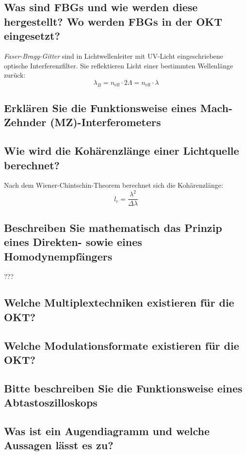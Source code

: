 \documentclass[a4paper]{scrartcl}
\begin{document}
\subsection*{Was sind FBGs und wie werden diese hergestellt? Wo werden FBGs in der OKT eingesetzt?}
\emph{Faser-Bragg-Gitter} sind in Lichtwellenleiter mit UV-Licht eingeschriebene optische Interferenzfilter.
Sie reflektieren Licht einer bestimmten Wellenlänge zurück:
\begin{equation*}
    \lambda_B = n_\text{eff} \cdot 2 \Lambda = n_\text{eff} \cdot \lambda
\end{equation*}




\subsection*{Erklären Sie die Funktionsweise eines Mach-Zehnder (MZ)-Interferometers}



\subsection*{Wie wird die Kohärenzlänge einer Lichtquelle berechnet?}
Nach dem Wiener-Chintschin-Theorem berechnet sich die Kohärenzlänge:
\begin{equation*}
     l_c=\frac{\lambda^2}{\Delta\lambda}
\end{equation*}


\subsection*{Beschreiben Sie mathematisch das Prinzip eines Direkten- sowie eines Homodynempfängers}
???

\subsection*{Welche Multiplextechniken existieren für die OKT?}

\subsection*{Welche Modulationsformate existieren für die OKT?}

\subsection*{Bitte beschreiben Sie die Funktionsweise eines Abtastoszilloskops}

\subsection*{Was ist ein Augendiagramm und welche Aussagen lässt es zu?}
\end{document}
